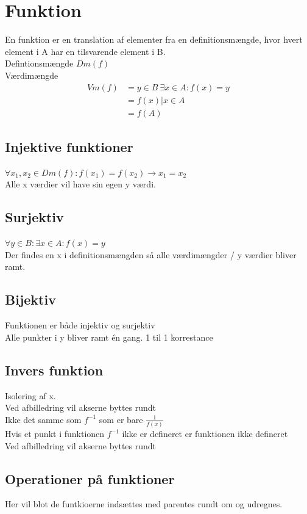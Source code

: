 \documentclass[12pt, a4paper]{article}
\begin{document}
			\section{Funktion}
				En funktion er en translation af elementer fra en definitionsmængde, hvor hvert element i A har en tilsvarende element i B.\\
				Defintionsmængde $Dm(f)$\\
				Værdimængde 
				\begin{align*}
					Vm(f)&={y\in B \ \exists x \in A: f(x)=y}\\
						&={f(x)|x\in A}\\
						&=f(A)
				\end{align*}
				\subsection{Injektive funktioner}
					$\forall x_1,x_2 \in Dm(f): f(x_1)=f(x_2)\rightarrow x_1=x_2$\\
					Alle x værdier vil have sin egen y værdi.
				\subsection{Surjektiv}
					$\forall y \in B: \exists x \in A: f(x)=y$\\
					Der findes en x i definitionsmængden så alle værdimængder / y værdier bliver ramt.
				\subsection{Bijektiv}
					Funktionen er både injektiv og surjektiv\\
					Alle punkter i y bliver ramt én gang. 1 til 1 korrestance 
				\subsection{Invers funktion}
					Isolering af x.\\
					Ved afbilledring vil akserne byttes rundt\\
					Ikke det samme som $f^{-1}$ som er bare $\frac{1}{f(x)}$\\
					Hvis et punkt i funktionen $f^{-1}$ ikke er defineret er funktionen ikke defineret\\
					Ved afbilledring vil akserne byttes rundt
				\subsection{Operationer på funktioner}
					Her vil blot de funtkioerne indsættes med parentes rundt om og udregnes.
\end{document}
